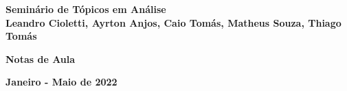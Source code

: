 %
%
%
\begin{titlepage}			%

\begin{center}				%

	{\fontsize{16mm}{11mm}
		\selectfont
		\textbf{Seminário de Tópicos em Análise}}
		\\[0.5cm]
	{\fontsize{8mm}{8mm}\selectfont
		\textbf{Leandro Cioletti, Ayrton Anjos, Caio Tomás, Matheus Souza, Thiago Tomás}
		}

	\vspace{80mm}				%


	{\fontsize{14pt}{14pt}\selectfont
		\textbf{Notas de Aula}
		}
	
	\vspace{7pt}				%


	{\fontsize{14pt}{14pt}\selectfont
		\textbf{Janeiro - Maio de 2022}
		}
	
	\vfill						%


	\vspace{10mm}				%
	\begin{figure}[h]            %
		\centering
	\end{figure} 

\end{center}
\end{titlepage}
